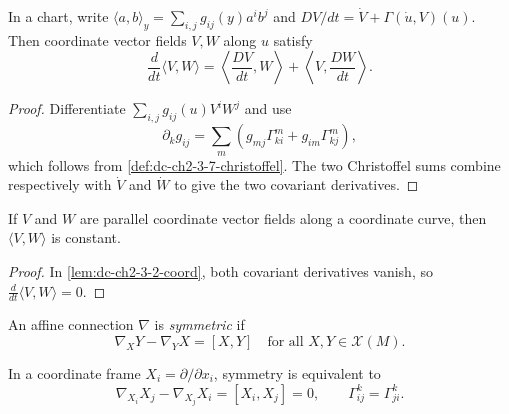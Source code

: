 \begin{lemma}
  \label{lem:dc-ch2-3-2-coord}
  \leanok
  In a chart, write
  $\langle a,b\rangle_y=\sum_{i,j}g_{ij}(y)a^ib^j$ and
  $DV/dt=\dot V+\Gamma(\dot u,V)(u)$. Then coordinate vector fields $V,W$
  along $u$ satisfy
  \[
    \frac{d}{dt}\langle V,W\rangle
      =\left\langle\frac{DV}{dt},W\right\rangle
       +\left\langle V,\frac{DW}{dt}\right\rangle.
  \]
\end{lemma}
\begin{proof}
  \leanok
  \sketch
  Differentiate $\sum_{i,j}g_{ij}(u)V^iW^j$ and use
  \[
    \partial_kg_{ij}
      =\sum_m\left(g_{mj}\Gamma^m_{ki}+g_{im}\Gamma^m_{kj}\right),
  \]
  which follows from \cref{def:dc-ch2-3-7-christoffel}. The two Christoffel
  sums combine respectively with $\dot V$ and $\dot W$ to give the two
  covariant derivatives.
\end{proof}

\begin{lemma}
  \label{lem:dc-ch2-3-1-coord}
  \leanok
  If $V$ and $W$ are parallel coordinate vector fields along a coordinate
  curve, then $\langle V,W\rangle$ is constant.
\end{lemma}
\begin{proof}
  \leanok
  \sketch
  In \cref{lem:dc-ch2-3-2-coord}, both covariant derivatives vanish, so
  $\frac{d}{dt}\langle V,W\rangle=0$.
\end{proof}

\begin{definition}
  \label{def:dc-ch2-3-4}
  \leanok
  An affine connection $\nabla$ is \emph{symmetric} if
  \[
    \nabla_XY-\nabla_YX=[X,Y]
    \quad\text{for all }X,Y\in\mathcal{X}(M).\tag{5}
  \]
\end{definition}

\begin{remark}[Remark 3.5]
  \label{rem:dc-ch2-3-5}
  \leanok
  In a coordinate frame $X_i=\partial/\partial x_i$, symmetry is equivalent to
  \[
    \nabla_{X_i}X_j-\nabla_{X_j}X_i=[X_i,X_j]=0,
    \qquad
    \Gamma_{ij}^k=\Gamma_{ji}^k.\tag{5'}
  \]
\end{remark}

